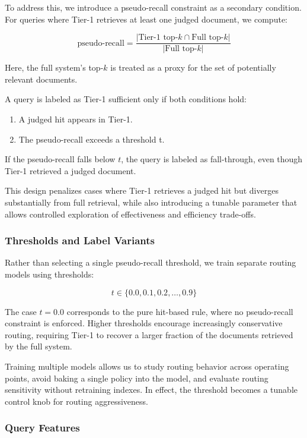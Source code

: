 \documentclass[11pt]{article}
\begin{document}
To address this, we introduce a pseudo-recall constraint as a secondary condition. For queries where Tier-1 retrieves at least one judged document, we compute:

\[\text{pseudo-recall} = \frac{|\text{Tier-1 top-}k \cap \text{Full top-}k|}{|\text{Full top-}k|}\]

Here, the full system’s top-$k$ is treated as a proxy for the set of potentially relevant documents.

\noindent A query is labeled as Tier-1 sufficient only if both conditions hold:
\begin{enumerate}
    \item A judged hit appears in Tier-1.
    \item The pseudo-recall exceeds a threshold t.
\end{enumerate}

\noindent If the pseudo-recall falls below $t$, the query is labeled as fall-through, even though Tier-1 retrieved a judged document.

This design penalizes cases where Tier-1 retrieves a judged hit but diverges substantially from full retrieval, while also introducing a tunable parameter that allows controlled exploration of effectiveness and efficiency trade-offs.

\subsubsection{Thresholds and Label Variants}

Rather than selecting a single pseudo-recall threshold, we train separate routing models using thresholds:

\[t \in \{0.0, 0.1, 0.2, \dots, 0.9\}\]

The case $t = 0.0$ corresponds to the pure hit-based rule, where no pseudo-recall constraint is enforced. Higher thresholds encourage increasingly conservative routing, requiring Tier-1 to recover a larger fraction of the documents retrieved by the full system.

Training multiple models allows us to study routing behavior across operating points, avoid baking a single policy into the model, and evaluate routing sensitivity without retraining indexes. In effect, the threshold becomes a tunable control knob for routing aggressiveness.

\subsubsection{Query Features}
\end{document}
